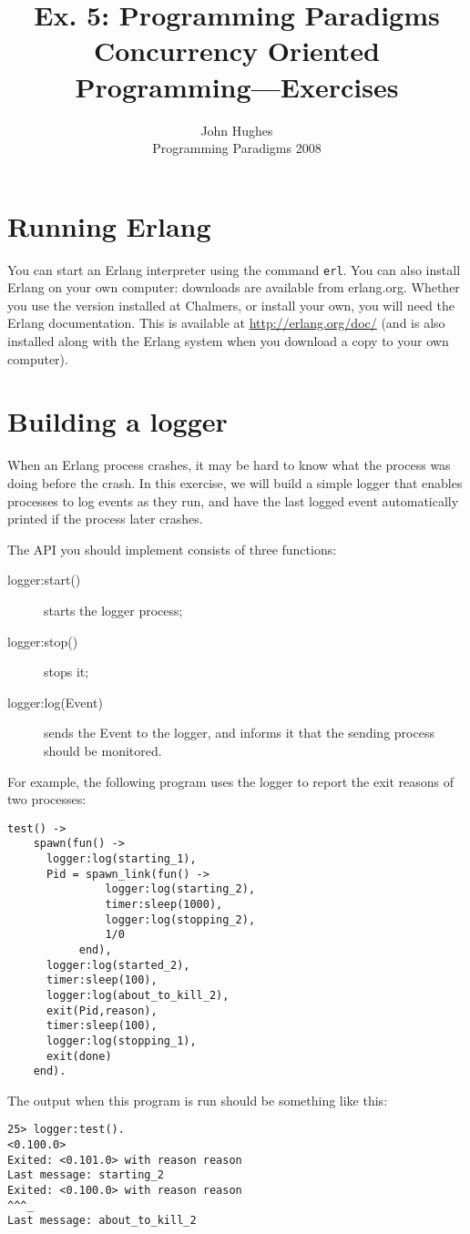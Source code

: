 \documentclass{article}
\newcommand{\courseinfo}{ John Hughes \\ Programming Paradigms 2008 }
\begin{document}
\title{Ex. 5: Programming Paradigms 
\\
Concurrency Oriented Programming—Exercises}
\author{\courseinfo}
\date{}
\maketitle

\section{Running Erlang}

You can start an Erlang interpreter using the command \verb!erl!. You
can also install Erlang on your own computer: downloads are available
from erlang.org. Whether you use the version installed at Chalmers, or
install your own, you will need the Erlang documentation. This is
available at \url{http://erlang.org/doc/} (and is also installed along
with the Erlang system when you download a copy to your own computer).


\section{Building a logger}

When an Erlang process crashes, it may be hard to know what the
process was doing before the crash. In this exercise, we will build a
simple logger that enables processes to log events as they run, and
have the last logged event automatically printed if the process later
crashes.

The API you should implement consists of three functions:

\begin{description}
\item[\textsf{logger:start()}]  starts the logger process;
\item[\textsf{logger:stop()}]   stops it;
\item[\textsf{logger:log(Event)}] sends the \textsf{Event} to the logger, and
  informs it that the sending process should be monitored.
\end{description}

For example, the following program uses the logger to report the exit reasons of two processes:
\begin{verbatim}
test() ->
    spawn(fun() ->
	  logger:log(starting_1),
	  Pid = spawn_link(fun() ->
			   logger:log(starting_2),
			   timer:sleep(1000),
			   logger:log(stopping_2),
			   1/0
		   end),
	  logger:log(started_2),
	  timer:sleep(100),
	  logger:log(about_to_kill_2),
	  exit(Pid,reason),
	  timer:sleep(100),
	  logger:log(stopping_1),
	  exit(done)
	end).
\end{verbatim}
The output when this program is run should be something  like this:
\begin{verbatim}
25> logger:test().
<0.100.0>
Exited: <0.101.0> with reason reason
Last message: starting_2
Exited: <0.100.0> with reason reason
^^^_
Last message: about_to_kill_2
\end{verbatim}
\end{document}
